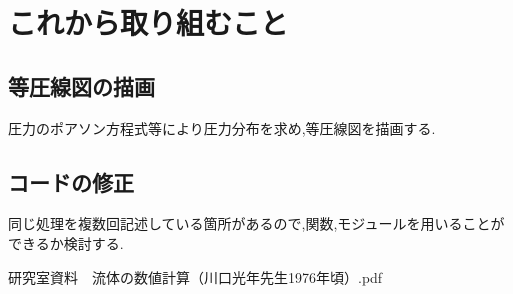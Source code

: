 \documentclass[upLaTeX,a4paper]{jsarticle}
\begin{document}
\section{これから取り組むこと}
\subsection{等圧線図の描画}
圧力のポアソン方程式等により圧力分布を求め,等圧線図を描画する.

\subsection{コードの修正}
同じ処理を複数回記述している箇所があるので,関数,モジュールを用いることができるか検討する.

\begin{thebibliography}{9}
   研究室資料　流体の数値計算（川口光年先生1976年頃）.pdf
\end{thebibliography}
\end{document}
